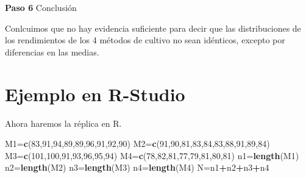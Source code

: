 \documentclass[a4paper,oneside,openany]{book}
\newenvironment{Shaded}{\begin{snugshade}}{\end{snugshade}}
\newcommand{\KeywordTok}[1]{\textcolor[rgb]{0.13,0.29,0.53}{\textbf{#1}}}
\newcommand{\DecValTok}[1]{\textcolor[rgb]{0.00,0.00,0.81}{#1}}
\newcommand{\OperatorTok}[1]{\textcolor[rgb]{0.81,0.36,0.00}{\textbf{#1}}}
\newcommand{\NormalTok}[1]{#1}
\begin{document}
\textbf{Paso 6} Conclusión

Conlcuimos que no hay evidencia suficiente para decir que las
distribuciones de los rendimientos de los 4 métodos de cultivo no sean
idénticos, excepto por diferencias en las medias.

\section{Ejemplo en R-Studio}\label{ejemplo-en-r-studio-8}

Ahora haremos la réplica en R.

\begin{Shaded}
\begin{Highlighting}[]
\NormalTok{M1=}\KeywordTok{c}\NormalTok{(}\DecValTok{83}\NormalTok{,}\DecValTok{91}\NormalTok{,}\DecValTok{94}\NormalTok{,}\DecValTok{89}\NormalTok{,}\DecValTok{89}\NormalTok{,}\DecValTok{96}\NormalTok{,}\DecValTok{91}\NormalTok{,}\DecValTok{92}\NormalTok{,}\DecValTok{90}\NormalTok{)}
\NormalTok{M2=}\KeywordTok{c}\NormalTok{(}\DecValTok{91}\NormalTok{,}\DecValTok{90}\NormalTok{,}\DecValTok{81}\NormalTok{,}\DecValTok{83}\NormalTok{,}\DecValTok{84}\NormalTok{,}\DecValTok{83}\NormalTok{,}\DecValTok{88}\NormalTok{,}\DecValTok{91}\NormalTok{,}\DecValTok{89}\NormalTok{,}\DecValTok{84}\NormalTok{)}
\NormalTok{M3=}\KeywordTok{c}\NormalTok{(}\DecValTok{101}\NormalTok{,}\DecValTok{100}\NormalTok{,}\DecValTok{91}\NormalTok{,}\DecValTok{93}\NormalTok{,}\DecValTok{96}\NormalTok{,}\DecValTok{95}\NormalTok{,}\DecValTok{94}\NormalTok{)}
\NormalTok{M4=}\KeywordTok{c}\NormalTok{(}\DecValTok{78}\NormalTok{,}\DecValTok{82}\NormalTok{,}\DecValTok{81}\NormalTok{,}\DecValTok{77}\NormalTok{,}\DecValTok{79}\NormalTok{,}\DecValTok{81}\NormalTok{,}\DecValTok{80}\NormalTok{,}\DecValTok{81}\NormalTok{)}
\NormalTok{n1=}\KeywordTok{length}\NormalTok{(M1)}
\NormalTok{n2=}\KeywordTok{length}\NormalTok{(M2)}
\NormalTok{n3=}\KeywordTok{length}\NormalTok{(M3)}
\NormalTok{n4=}\KeywordTok{length}\NormalTok{(M4)}
\NormalTok{N=n1}\OperatorTok{+}\NormalTok{n2}\OperatorTok{+}\NormalTok{n3}\OperatorTok{+}\NormalTok{n4}


\end{Highlighting}
\end{Shaded}
\end{document}
